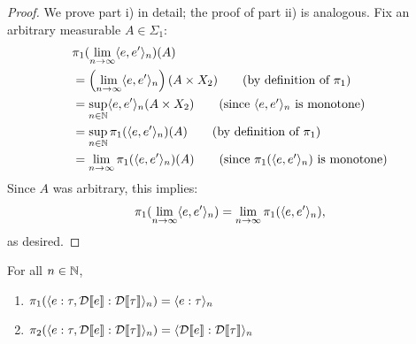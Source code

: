 \begin{proof}
	We prove part i) in detail; the proof of part ii) is analogous. Fix an arbitrary measurable $A \in \Sigma_1$:
	\begin{align*}
		&\pi_1(\lim_{n \to \infty} \bigsemstep{e,e'}{n})(A) \\
		&= \left(\lim_{n \to \infty} \bigsemstep{e,e'}{n}\right)(A \times X_2) \tag{by definition of $\pi_1$}\\
		&= \sup_{n \in \Nats} \bigsemstep{e,e'}{n}(A \times X_2) \tag{since $\bigsemstep{e,e'}{n}$ is monotone}\\
		&= \sup_{n \in \Nats} \pi_1(\bigsemstep{e,e'}{n})(A) \tag{by definition of $\pi_1$}\\
		&= \lim_{n \to \infty} \pi_1(\bigsemstep{e,e'}{n})(A) \tag{since $\pi_1(\bigsemstep{e,e'}{n})$ is monotone}
	\end{align*}
	Since $A$ was arbitrary, this implies:
	\[
		\pi_1(\lim_{n \to \infty} \langle e,e' \rangle_{n}) =  \lim_{n \to \infty} \pi_1(\langle e,e' \rangle_{n}),
	\]
	as desired.
\end{proof}

\begin{lemma}
	\label{lem:proj_cont}
	For all $n \in \mathbb{N}$, 
	\begin{enumerate}
		\item $\pi_1(\langle e : \tau,\mathcal{D}\llbracket e \rrbracket : \mathcal{D}\llbracket \tau \rrbracket \rangle_{n}) = \langle e : \tau \rangle_{n}$
		\item $\pi_2(\langle e : \tau,\mathcal{D}\llbracket e \rrbracket : \mathcal{D}\llbracket \tau \rrbracket \rangle_{n}) = \langle \mathcal{D}\llbracket e \rrbracket : \mathcal{D}\llbracket \tau \rrbracket \rangle_{n}$
	\end{enumerate}
\end{lemma}


